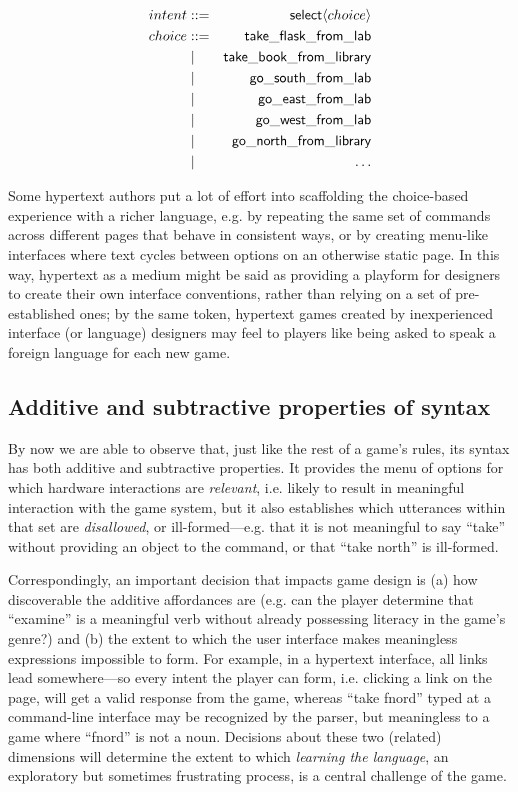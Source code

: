  \begin{eqnarray*}
    intent &::=& \mathsf{select}\langle choice \rangle\\
    choice &::=& \mathsf{take\_flask\_from\_lab}\\
           &\mid& \mathsf{take\_book\_from\_library}\\
           &\mid& \mathsf{go\_south\_from\_lab} \\
           &\mid& \mathsf{go\_east\_from\_lab} \\
           &\mid& \mathsf{go\_west\_from\_lab} \\
           &\mid& \mathsf{go\_north\_from\_library} \\
           &\mid& \hdots
  \end{eqnarray*}

  Some hypertext authors put a lot of effort into scaffolding the
  choice-based experience with a richer language, e.g. by repeating the
  same set of commands across different pages that behave in consistent
  ways, or by creating menu-like interfaces where text cycles between
  options on an otherwise static page. In this way, hypertext as a medium
  might be said as providing a playform for designers to create their own
  interface conventions, rather than relying on a set of pre-established
  ones; by the same token, hypertext games created by inexperienced
  interface (or language) designers may feel to players like being asked to
  speak a foreign language for each new game.

  \subsection*{Additive and subtractive properties of syntax}
  
  By now we are able to observe that, just like the rest of a game's rules,
  its syntax has both additive and subtractive properties. It provides the
  menu of options for which hardware interactions are {\em relevant}, i.e.
  likely to result in meaningful interaction with the game system, but it
  also establishes which utterances within that set are {\em disallowed},
  or ill-formed---e.g. that it is not meaningful to say ``take'' without
  providing an object to the command, or that ``take north'' is ill-formed.

  Correspondingly, an important decision that impacts game design is (a)
  how discoverable the additive affordances are (e.g. can the player
  determine that ``examine'' is a meaningful verb without already
  possessing literacy in the game's genre?) and (b) the extent to which the
  user interface makes meaningless expressions impossible to form. For
  example, in a hypertext interface, all links lead somewhere---so every
  intent the player can form, i.e. clicking a link on the page, will get a
  valid response from the game, whereas ``take fnord'' typed at a
  command-line interface may be recognized by the parser, but meaningless
  to a game where ``fnord'' is not a noun.  Decisions about these two
  (related) dimensions will determine the extent to which {\em learning the
  language}, an exploratory but sometimes frustrating process, is a central
  challenge of the game.
  


